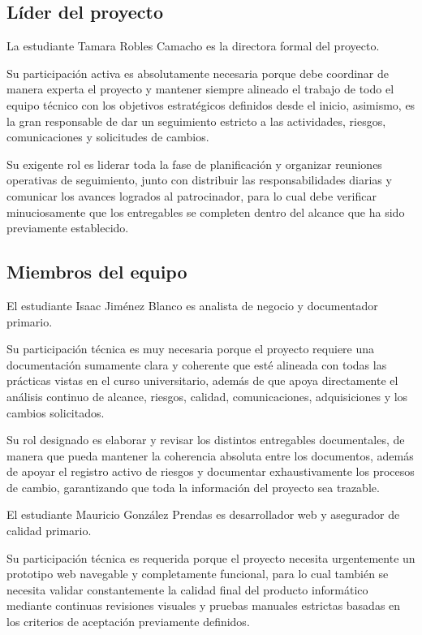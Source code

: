 \documentclass[11pt,spanish]{article}
\begin{document}
\subsection{Líder del proyecto}

La estudiante Tamara Robles Camacho es la directora formal del proyecto.

Su participación activa es absolutamente necesaria porque debe coordinar de manera experta el proyecto y mantener siempre alineado el trabajo de todo el equipo técnico con los objetivos estratégicos definidos desde el inicio, asimismo, es la gran responsable de dar un seguimiento estricto a las actividades, riesgos, comunicaciones y solicitudes de cambios.

Su exigente rol es liderar toda la fase de planificación y organizar reuniones operativas de seguimiento, junto con distribuir las responsabilidades diarias y comunicar los avances logrados al patrocinador, para lo cual debe verificar minuciosamente que los entregables se completen dentro del alcance que ha sido previamente establecido.

\subsection{Miembros del equipo}

El estudiante Isaac Jiménez Blanco es analista de negocio y documentador primario.

Su participación técnica es muy necesaria porque el proyecto requiere una documentación sumamente clara y coherente que esté alineada con todas las prácticas vistas en el curso universitario, además de que apoya directamente el análisis continuo de alcance, riesgos, calidad, comunicaciones, adquisiciones y los cambios solicitados.

Su rol designado es elaborar y revisar los distintos entregables documentales, de manera que pueda mantener la coherencia absoluta entre los documentos, además de apoyar el registro activo de riesgos y documentar exhaustivamente los procesos de cambio, garantizando que toda la información del proyecto sea trazable.

El estudiante Mauricio González Prendas es desarrollador web y asegurador de calidad primario.

Su participación técnica es requerida porque el proyecto necesita urgentemente un prototipo web navegable y completamente funcional, para lo cual también se necesita validar constantemente la calidad final del producto informático mediante continuas revisiones visuales y pruebas manuales estrictas basadas en los criterios de aceptación previamente definidos.
\end{document}

